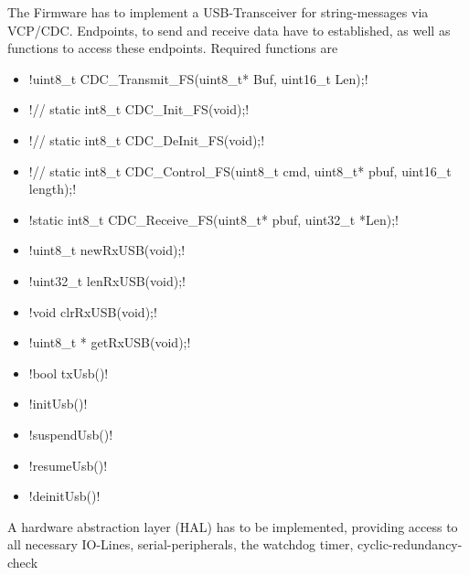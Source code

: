 	{ The Firmware has to implement a USB-Transceiver for string-messages via VCP/CDC. Endpoints, to send and receive data have to established, as well as functions to access these endpoints.
		Required functions are 
		\begin{itemize} \setlength\itemsep{1px}
		\item \lstC !uint8_t CDC_Transmit_FS(uint8_t* Buf, uint16_t Len);!
		\item \lstC !// static int8_t CDC_Init_FS(void);!
		\item \lstC !// static int8_t CDC_DeInit_FS(void);!
		\item \lstC !// static int8_t CDC_Control_FS(uint8_t cmd, uint8_t* pbuf, uint16_t length);!
		\item \lstC !static int8_t CDC_Receive_FS(uint8_t* pbuf, uint32_t *Len);!
		\item \lstC !uint8_t newRxUSB(void);!
		\item \lstC !uint32_t lenRxUSB(void);!
		\item \lstC !void 	clrRxUSB(void);!
		\item \lstC !uint8_t *	getRxUSB(void);!
		\item \lstC !bool txUsb()!
		\item \lstC !initUsb()!
		\item \lstC !suspendUsb()!
		\item \lstC !resumeUsb()!
		\item \lstC !deinitUsb()!

		\end{itemize}
	}

	{ A hardware abstraction layer (HAL) has to be implemented, providing access to all necessary IO-Lines, serial-peripherals, the watchdog timer, cyclic-redundancy-check
	}

